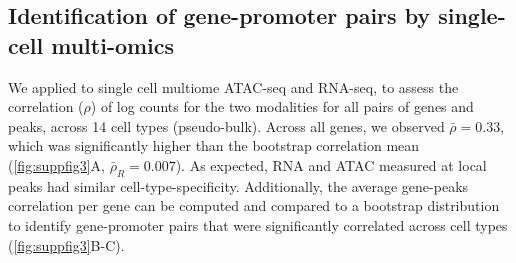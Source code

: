 

\subsection{Identification of gene-promoter pairs by single-cell multi-omics}
We applied \bootranges to
single cell multiome
ATAC-seq and RNA-seq, to assess the correlation ($\rho$) of log counts for the two
modalities for all pairs of genes and peaks, across
14 cell types (pseudo-bulk). Across all genes, we observed
$\bar{\rho} = 0.33$, which was 
significantly higher than the bootstrap correlation mean
(\cref{fig:suppfig3}A, $\bar{\rho}_{R} = 0.007$). As expected, RNA
and ATAC measured at local peaks had similar cell-type-specificity.
Additionally, the average gene-peaks correlation per gene can be
computed and compared to a bootstrap distribution to
identify gene-promoter pairs that were significantly correlated across
cell types (\cref{fig:suppfig3}B-C).


